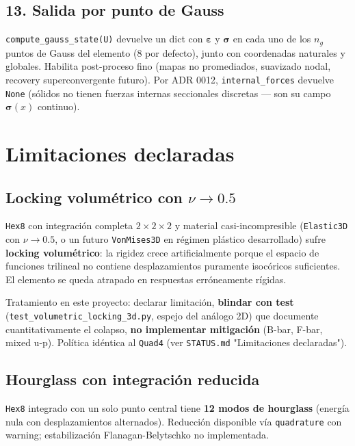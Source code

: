 \documentclass[11pt,letterpaper,oneside]{report}
\begin{document}
\subsection{13. Salida por punto de Gauss}

\texttt{compute\_gauss\_state(U)} devuelve un dict con $\boldsymbol\varepsilon$ y $\boldsymbol\sigma$ en cada uno de los $n_g$ puntos de Gauss del elemento (8 por defecto), junto con coordenadas naturales y globales. Habilita post-proceso fino (mapas no promediados, suavizado nodal, recovery superconvergente futuro). Por ADR 0012, \texttt{internal\_forces} devuelve \texttt{None} (sólidos no tienen fuerzas internas seccionales discretas --- son su campo $\boldsymbol\sigma(x)$ continuo).


\section{Limitaciones declaradas}

\subsection{Locking volumétrico con $\nu \to 0.5$}

\texttt{Hex8} con integración completa $2\times 2\times 2$ y material casi-incompresible (\texttt{Elastic3D} con $\nu \to 0.5$, o un futuro \texttt{VonMises3D} en régimen plástico desarrollado) sufre \textbf{locking volumétrico}: la rigidez crece artificialmente porque el espacio de funciones trilineal no contiene desplazamientos puramente isocóricos suficientes. El elemento se queda atrapado en respuestas erróneamente rígidas.

Tratamiento en este proyecto: declarar limitación, \textbf{blindar con test} (\texttt{test\_volumetric\_locking\_3d.py}, espejo del análogo 2D) que documente cuantitativamente el colapso, \textbf{no implementar mitigación} (B-bar, F-bar, mixed u-p). Política idéntica al \texttt{Quad4} (ver \texttt{STATUS.md} "Limitaciones declaradas").

\subsection{Hourglass con integración reducida}

\texttt{Hex8} integrado con un solo punto central tiene \textbf{12 modos de hourglass} (energía nula con desplazamientos alternados). Reducción disponible vía \texttt{quadrature} con warning; estabilización Flanagan-Belytschko no implementada.
\end{document}
